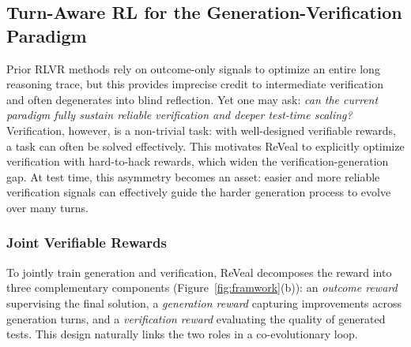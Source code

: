 \documentclass{article} %
\begin{document}
\subsection{Turn-Aware RL for the Generation-Verification Paradigm}
Prior RLVR methods rely on outcome-only signals to optimize an entire long reasoning trace, but this provides imprecise credit to intermediate verification and often degenerates into blind reflection. Yet one may ask: \textit{can the current paradigm fully sustain reliable verification and deeper test-time scaling?} Verification, however, is a non-trivial task: with well-designed verifiable rewards, a task can often be solved effectively. This motivates ReVeal to explicitly optimize verification with hard-to-hack rewards, which widen the verification-generation gap. At test time, this asymmetry becomes an asset: easier and more reliable verification signals can effectively guide the harder generation process to evolve over many turns.
\subsubsection{Joint Verifiable Rewards}


To jointly train generation and verification, ReVeal decomposes the reward into three complementary components (Figure~\ref{fig:framwork}(b)): an \emph{outcome reward} supervising the final solution, a \emph{generation reward} capturing improvements across generation turns, and a \emph{verification reward} evaluating the quality of generated tests. This design naturally links the two roles in a co-evolutionary loop.
\end{document}
